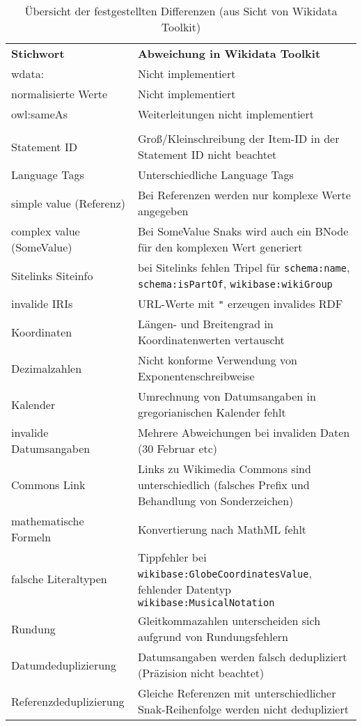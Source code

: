 \begin{table}
  \begin{tabular}{lp{}}
    \bfseries{Stichwort} & \bfseries{Abweichung in Wikidata Toolkit} \\
    wdata: & Nicht implementiert \\
    normalisierte Werte & Nicht implementiert \\
    owl:sameAs & Weiterleitungen nicht implementiert \\
    \\
    Statement ID & Groß/Kleinschreibung der Item-ID in der Statement ID nicht beachtet \\
    Language Tags & Unterschiedliche Language Tags \\
    simple value (Referenz) & Bei Referenzen werden nur komplexe Werte angegeben \\
    complex value (SomeValue) & Bei SomeValue Snaks wird auch ein BNode für den komplexen Wert generiert \\
    Sitelinks Siteinfo & bei Sitelinks fehlen Tripel für \verb|schema:name|, \verb|schema:isPartOf|, \verb|wikibase:wikiGroup| \\
    invalide IRIs & URL-Werte mit \verb|"| erzeugen invalides RDF \\
    Koordinaten & Längen- und Breitengrad in Koordinatenwerten vertauscht \\
    Dezimalzahlen & Nicht konforme Verwendung von Exponentenschreibweise \\
    Kalender & Umrechnung von Datumsangaben in gregorianischen Kalender fehlt \\
    invalide Datumsangaben & Mehrere Abweichungen bei invaliden Daten (30 Februar etc) \\
    Commons Link & Links zu Wikimedia Commons sind unterschiedlich (falsches Prefix und Behandlung von Sonderzeichen) \\
    mathematische Formeln & Konvertierung nach MathML fehlt \\
    falsche Literaltypen & Tippfehler bei \verb|wikibase:GlobeCoordinatesValue|, fehlender Datentyp \verb|wikibase:MusicalNotation| \\
    Rundung & Gleitkommazahlen unterscheiden sich aufgrund von Rundungsfehlern \\
    Datumdeduplizierung & Datumsangaben werden falsch dedupliziert (Präzision nicht beachtet) \\
    Referenzdeduplizierung & Gleiche Referenzen mit unterschiedlicher Snak-Reihenfolge werden nicht dedupliziert \\
  \end{tabular}
  \caption{Übersicht der festgestellten Differenzen (aus Sicht von Wikidata Toolkit)}
  \label{tab:wdtk-diff}
\end{table}

